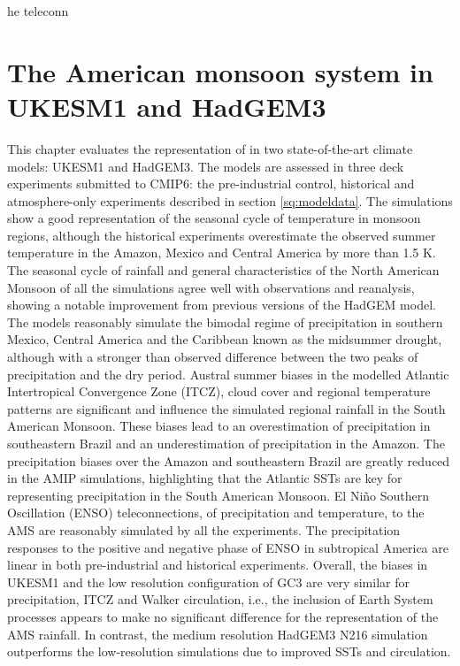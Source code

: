 
he teleconn\chapter{\label{ch:4-ams}The American monsoon system in UKESM1 and HadGEM3}

\minitoc

This chapter evaluates the representation of in two state-of-the-art climate models: UKESM1 and HadGEM3. The models are assessed in three deck experiments submitted to CMIP6:  the pre-industrial control, historical and atmosphere-only experiments described in section \ref{sq:modeldata}.
The simulations show a good representation of the seasonal cycle of temperature  in monsoon regions, although the historical experiments overestimate the observed summer temperature in the Amazon, Mexico and Central America by more than 1.5 K.
The seasonal cycle of rainfall and general characteristics of the North American Monsoon of all the simulations agree well with observations and reanalysis, showing  a notable improvement from previous versions of the HadGEM model.
 The models reasonably simulate the bimodal regime of precipitation in southern Mexico, Central America and the Caribbean known as the midsummer drought, although  with a stronger than observed difference between the two peaks of precipitation and the dry period. 
Austral summer biases in the modelled Atlantic Intertropical Convergence Zone (ITCZ), cloud cover and regional temperature patterns are significant and influence the simulated regional rainfall in the South American Monsoon.
These biases lead to an overestimation of precipitation in southeastern Brazil and an underestimation of precipitation in the Amazon.
 The precipitation biases over the Amazon and southeastern Brazil are greatly reduced in the AMIP simulations, highlighting that the Atlantic SSTs are key for representing precipitation in the South American Monsoon.  
  El Ni\~no Southern Oscillation (ENSO) teleconnections, of precipitation and temperature, to the AMS are reasonably simulated by all the experiments. 
The precipitation responses to the positive and negative phase of ENSO in subtropical America are linear in both pre-industrial and historical experiments.
  Overall, the biases in UKESM1 and the low resolution configuration of GC3 are very similar for precipitation, ITCZ and Walker circulation, i.e., the inclusion of  Earth System processes appears to make no significant difference for the representation of the AMS rainfall. 
In contrast, the medium resolution HadGEM3 N216 simulation outperforms the low-resolution simulations due to improved SSTs and circulation.


